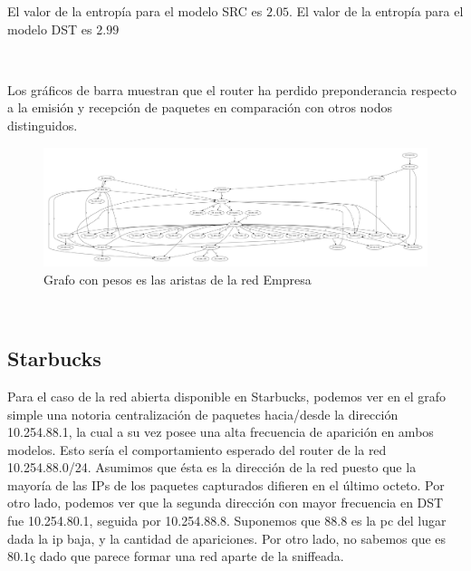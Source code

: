 El valor de la entropía para el modelo SRC es $2.05$. El valor de la entropía para 
el modelo DST es $2.99$


~

Los gráficos de barra muestran que el router ha perdido preponderancia respecto a la emisión
y recepción de paquetes en comparación con otros nodos distinguidos.

\begin{figure}[H]
	\center
	\includegraphics[scale = 0.18]{resultados/empresa/conectividad.pdf}
	\caption{Grafo con pesos es las aristas de la red Empresa}
\end{figure}

~


\subsection{Starbucks}


Para el caso de la red abierta disponible en Starbucks, podemos ver en el 
grafo simple una notoria centralizaci\'on de paquetes hacia/desde la direcci\'on
10.254.88.1, la cual a su vez posee una alta frecuencia de aparici\'on en ambos
modelos. Esto ser\'ia el comportamiento esperado del router de la red
10.254.88.0/24. Asumimos que \'esta es la direcci\'on de la red puesto que 
la mayor\'ia de las IPs de los paquetes capturados difieren en el \'ultimo octeto.
Por otro lado, podemos ver que la segunda direcci\'on con mayor frecuencia en DST
fue 10.254.80.1, seguida por 10.254.88.8. Suponemos que $88.8$ es la pc del lugar
dada la ip baja, y la cantidad de apariciones. Por otro lado, no sabemos que es
$80.1ç$ dado que parece formar una red aparte de la sniffeada.

